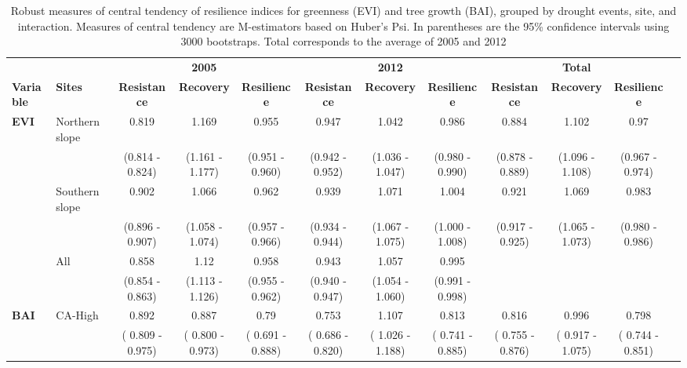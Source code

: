 \begin{table} 
\caption{Robust measures of central tendency of resilience indices for greenness (EVI) and tree growth (BAI), grouped by drought events, site, and interaction. Measures of central tendency are M-estimators based on Huber’s Psi. In parentheses are the 95\% confidence intervals using 3000 bootstraps. Total corresponds to the average of 2005 and 2012}
\label{tab:dendro:huber}
\begin{adjustbox}{width=\linewidth}
\begin{threeparttable}
\begin{tabular}{@{}ll|ccc|ccc|cccl@{}}
 &  & \multicolumn{1}{l}{} & \textbf{2005} & \multicolumn{1}{l|}{} & \multicolumn{1}{l}{} & \textbf{2012} & \multicolumn{1}{l|}{} & \multicolumn{1}{l}{} & \textbf{Total} & \multicolumn{1}{l}{} &  \\ \cmidrule(r){1-11}
\textbf{Variable} & \textbf{Sites} & \textbf{Resistance} & \textbf{Recovery} & \textbf{Resilience} & \textbf{Resistance} & \textbf{Recovery} & \textbf{Resilience} & \textbf{Resistance} & \textbf{Recovery} & \textbf{Resilience} &  \\ \cmidrule(r){1-11}
\textbf{EVI} & Northern slope & 0.819 & 1.169 & 0.955 & 0.947 & 1.042 & 0.986 & 0.884 & 1.102 & 0.97 &  \\
 &  & (0.814 - 0.824) & (1.161 - 1.177) & (0.951 - 0.960) & (0.942 - 0.952) & (1.036 - 1.047) & (0.980 - 0.990) & (0.878 - 0.889) & (1.096 - 1.108) & (0.967 - 0.974) &  \\ \cmidrule(lr){2-11}
 & Southern slope & 0.902 & 1.066 & 0.962 & 0.939 & 1.071 & 1.004 & 0.921 & 1.069 & 0.983 &  \\
 &  & (0.896 - 0.907) & (1.058 - 1.074) & (0.957 - 0.966) & (0.934 - 0.944) & (1.067 - 1.075) & (1.000 - 1.008) & (0.917 - 0.925) & (1.065 - 1.073) & (0.980 - 0.986) &  \\ \cmidrule(lr){2-11}
 & All & 0.858 & 1.12 & 0.958 & 0.943 & 1.057 & 0.995 &  &  &  &  \\
 &  & (0.854 - 0.863) & (1.113 - 1.126) & (0.955 - 0.962) & (0.940 - 0.947) & (1.054 - 1.060) & (0.991 - 0.998) &  &  &  &  \\ \cmidrule(r){1-11}
\textbf{BAI} & CA-High & 0.892 & 0.887 & 0.79 & 0.753 & 1.107 & 0.813 & 0.816 & 0.996 & 0.798 &  \\
 &  & ( 0.809 - 0.975) & ( 0.800 - 0.973) & ( 0.691 - 0.888) & ( 0.686 - 0.820) & ( 1.026 - 1.188) & ( 0.741 - 0.885) & ( 0.755 - 0.876) & ( 0.917 - 1.075) & ( 0.744 - 0.851) &  \\ \cmidrule(lr){2-11}

\end{tabular}
\end{threeparttable}
\end{adjustbox}
\end{table}
